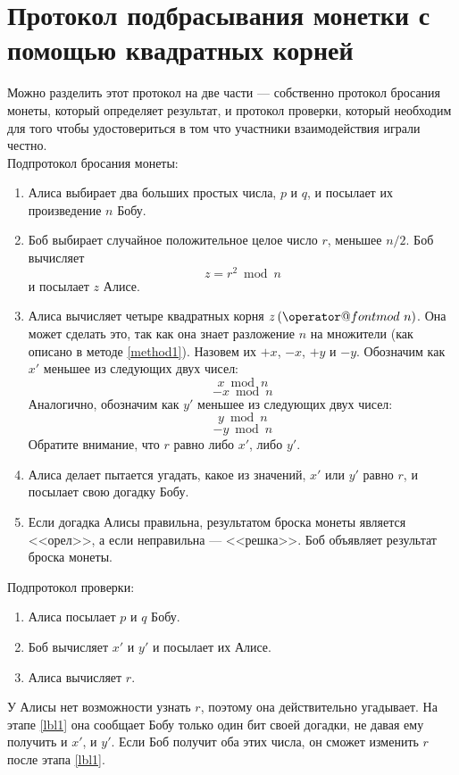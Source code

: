 \documentclass[12pt,a4paper]{report}
\makeatletter
\def\imod#1{\allowbreak\,({\operator@font mod}\ #1)}
\makeatother
\begin{document}
\section{Протокол подбрасывания монетки с помощью квадратных
    корней}

Можно разделить этот протокол на две части --- собственно
протокол бросания монеты, который определяет результат,
и протокол проверки, который необходим для того чтобы
удостовериться в том что участники взаимодействия играли
честно.\\

Подпротокол бросания монеты:

\begin{enumerate}
\item Алиса выбирает два больших простых числа, $p$
и $q$, и посылает их произведение $n$ Бобу.
\item Боб выбирает случайное положительное целое
число $r$, меньшее $n/2$. Боб вычисляет
$$z = r^2 \bmod{n}$$ и посылает $z$ Алисе.
\item Алиса вычисляет четыре квадратных корня $z \imod{n}$.
Она может сделать это, так как она знает разложение $n$ на множители
(как описано в методе \ref{method1}). Назовем их $+x$, $-x$, $+y$ и
$-y$. Обозначим как $x'$ меньшее из следующих двух чисел:
$$x \bmod{n}$$
$$-x \bmod{n}$$
Аналогично, обозначим как $y'$ меньшее из следующих двух чисел:
$$y \bmod{n}$$
$$-y \bmod{n}$$
Обратите внимание, что $r$ равно либо $x'$, либо $y'$.
\item \label{lbl1} Алиса делает пытается угадать, какое из значений,
$x'$ или $y'$ равно $r$, и посылает свою догадку Бобу.
\item Если догадка Алисы правильна, результатом броска
монеты является <<орел>>, а если неправильна --- <<решка>>.
Боб объявляет результат броска монеты.
\setcounter{enumi_saved}{\value{enumi}}
\end{enumerate}

Подпротокол проверки:

\begin{enumerate}
\setcounter{enumi}{\value{enumi_saved}}
\item Алиса посылает $p$ и $q$ Бобу.
\item Боб вычисляет $x'$ и $y'$ и посылает их Алисе.
\item Алиса вычисляет $r$.

\end{enumerate}

У Алисы нет возможности узнать $r$, поэтому она действительно
угадывает. На этапе \ref{lbl1} она сообщает Бобу только один бит
своей догадки, не давая ему получить и $x'$, и $y'$. Если Боб
получит оба этих числа, он сможет изменить $r$ после 
этапа \ref{lbl1}.
\end{document}
